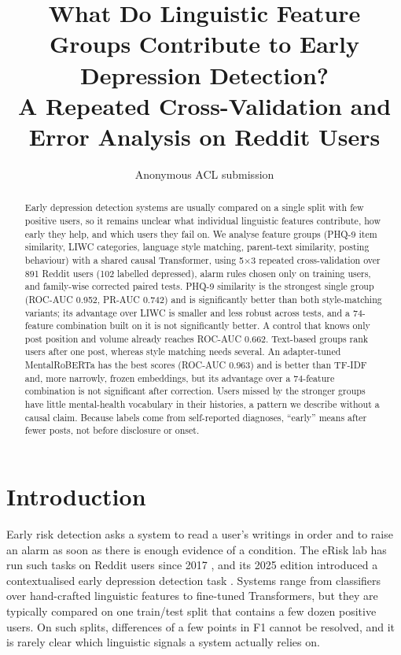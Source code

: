 \documentclass[11pt]{article}
\title{What Do Linguistic Feature Groups Contribute to Early Depression Detection?\\
A Repeated Cross-Validation and Error Analysis on Reddit Users}
\author{Anonymous ACL submission}
\begin{document}
\maketitle

\begin{abstract}
Early depression detection systems are usually compared on a single split with few positive users, so it remains unclear what individual linguistic features contribute, how early they help, and which users they fail on.
We analyse feature groups (PHQ-9 item similarity, LIWC categories, language style matching, parent-text similarity, posting behaviour) with a shared causal Transformer, using 5$\times$3 repeated cross-validation over 891 Reddit users (102 labelled depressed), alarm rules chosen only on training users, and family-wise corrected paired tests.
PHQ-9 similarity is the strongest single group (ROC-AUC 0.952, PR-AUC 0.742) and is significantly better than both style-matching variants; its advantage over LIWC is smaller and less robust across tests, and a 74-feature combination built on it is not significantly better.
A control that knows only post position and volume already reaches ROC-AUC 0.662.
Text-based groups rank users after one post, whereas style matching needs several.
An adapter-tuned MentalRoBERTa has the best scores (ROC-AUC 0.963) and is better than TF-IDF and, more narrowly, frozen embeddings, but its advantage over a 74-feature combination is not significant after correction.
Users missed by the stronger groups have little mental-health vocabulary in their histories, a pattern we describe without a causal claim.
Because labels come from self-reported diagnoses, ``early'' means after fewer posts, not before disclosure or onset.
\end{abstract}

\section{Introduction}

Early risk detection asks a system to read a user's writings in order and to raise an alarm as soon as there is enough evidence of a condition.
The eRisk lab has run such tasks on Reddit users since 2017 \citep{losada2017erisk,losada2018overview}, and its 2025 edition introduced a contextualised early depression detection task \citep{parapar2025overview}.
Systems range from classifiers over hand-crafted linguistic features \citep{trotzek2020utilizing} to fine-tuned Transformers, but they are typically compared on one train/test split that contains a few dozen positive users.
On such splits, differences of a few points in F1 cannot be resolved, and it is rarely clear which linguistic signals a system actually relies on.
\end{document}
